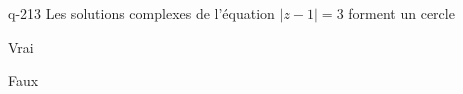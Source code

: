 \begin{truefalse}{q-213}
Les solutions complexes de l'équation $|z-1|=3$ forment un cercle
\item* Vrai
\item Faux
\end{truefalse}

